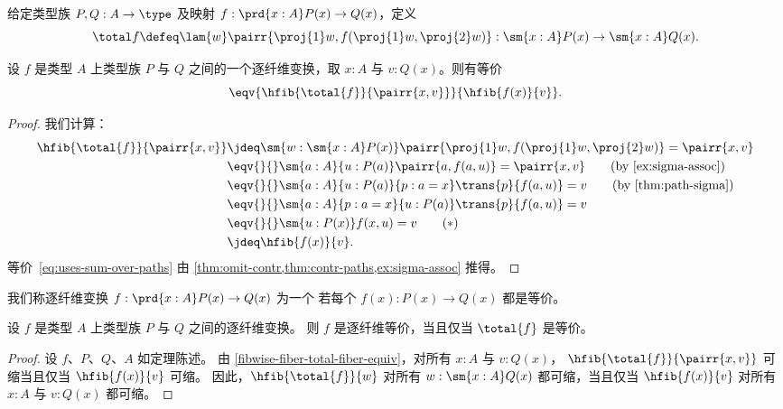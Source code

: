 \begin{defn}\label{defn:total-map}
  给定类型族 $P,Q:A\to\type$ 及映射 $f:\prd{x:A} P(x)\to Q(x)$，定义
  \begin{equation*}
    \total f  \defeq \lam{w}\pairr{\proj{1}w,f(\proj{1}w,\proj{2}w)} : \sm{x:A}P(x)\to\sm{x:A}Q(x).
  \end{equation*}
\end{defn}

\begin{thm}\label{fibwise-fiber-total-fiber-equiv}
设 $f$ 是类型 $A$ 上类型族 $P$ 与
$Q$ 之间的一个逐纤维变换，取 $x:A$ 与 $v:Q(x)$。则有等价
\begin{equation*}
\eqv{\hfib{\total{f}}{\pairr{x,v}}}{\hfib{f(x)}{v}}.
\end{equation*}
\end{thm}
\begin{proof}
  我们计算：
\begin{align}
  \hfib{\total{f}}{\pairr{x,v}}
  & \jdeq \sm{w:\sm{x:A}P(x)}\pairr{\proj{1}w,f(\proj{1}w,\proj{2}w)}=\pairr{x,v}
  \notag \\
  & \eqv{}{} \sm{a:A}{u:P(a)}\pairr{a,f(a,u)}=\pairr{x,v}
  \tag{by~\cref{ex:sigma-assoc}} \\
  & \eqv{}{} \sm{a:A}{u:P(a)}{p:a=x}\trans{p}{f(a,u)}=v
  \tag{by \cref{thm:path-sigma}} \\
  & \eqv{}{} \sm{a:A}{p:a=x}{u:P(a)}\trans{p}{f(a,u)}=v
  \notag \\
  & \eqv{}{} \sm{u:P(x)}f(x,u)=v
  \tag{$*$}\label{eq:uses-sum-over-paths} \\
  & \jdeq \hfib{f(x)}{v}. \notag
\end{align}
等价~\eqref{eq:uses-sum-over-paths} 由 \cref{thm:omit-contr,thm:contr-paths,ex:sigma-assoc} 推得。
\end{proof}

我们称逐纤维变换 $f:\prd{x:A} P(x)\to Q(x)$ 为一个 %
%
若每个 $f(x):P(x) \to Q(x)$ 都是等价。

\begin{thm}\label{thm:total-fiber-equiv}
设 $f$ 是类型
$A$ 上类型族 $P$ 与 $Q$ 之间的逐纤维变换。
则 $f$ 是逐纤维等价，当且仅当 $\total{f}$ 是等价。
\end{thm}

\begin{proof}
设 $f$、$P$、$Q$、$A$ 如定理陈述。
由 \cref{fibwise-fiber-total-fiber-equiv}，对所有
$x:A$ 与 $v:Q(x)$，
$\hfib{\total{f}}{\pairr{x,v}}$ 可缩当且仅当
$\hfib{f(x)}{v}$ 可缩。
因此，$\hfib{\total{f}}{w}$ 对所有 $w:\sm{x:A}Q(x)$ 都可缩，当且仅当 $\hfib{f(x)}{v}$ 对所有 $x:A$ 与 $v:Q(x)$ 都可缩。
\end{proof}

